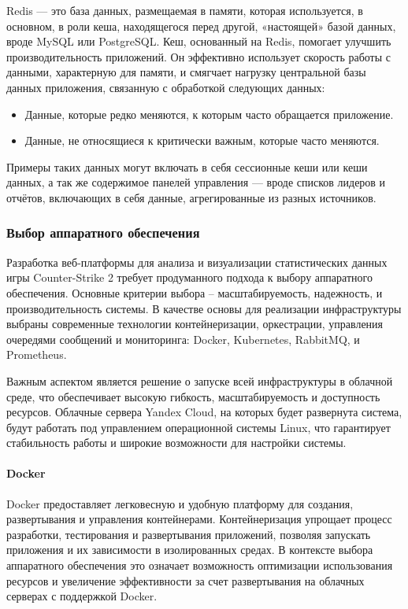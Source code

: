 Redis — это база данных, размещаемая в памяти, которая используется, в основном, в роли кеша, находящегося перед другой, «настоящей» базой данных, вроде MySQL или PostgreSQL. Кеш, основанный на Redis, помогает улучшить производительность приложений. Он эффективно использует скорость работы с данными, характерную для памяти, и смягчает нагрузку центральной базы данных приложения, связанную с обработкой следующих данных:
\begin{itemize}
	\item Данные, которые редко меняются, к которым часто обращается приложение.
	\item Данные, не относящиеся к критически важным, которые часто меняются.
\end{itemize}

Примеры таких данных могут включать в себя сессионные кеши или кеши данных, а так же содержимое панелей управления — вроде списков лидеров и отчётов, включающих в себя данные, агрегированные из разных источников.

\subsubsection{Выбор аппаратного обеспечения}

Разработка веб-платформы для анализа и визуализации статистических данных игры Counter-Strike 2 требует продуманного подхода к выбору аппаратного обеспечения. Основные критерии выбора – масштабируемость, надежность, и производительность системы. В качестве основы для реализации инфраструктуры выбраны современные технологии контейнеризации, оркестрации, управления очередями сообщений и мониторинга: Docker, Kubernetes, RabbitMQ, и Prometheus.

Важным аспектом является решение о запуске всей инфраструктуры в облачной среде, что обеспечивает высокую гибкость, масштабируемость и доступность ресурсов. Облачные сервера Yandex Cloud, на которых будет развернута система, будут работать под управлением операционной системы Linux, что гарантирует стабильность работы и широкие возможности для настройки системы.

\paragraph{Docker}

Docker предоставляет легковесную и удобную платформу для создания, развертывания и управления контейнерами. Контейнеризация упрощает процесс разработки, тестирования и развертывания приложений, позволяя запускать приложения и их зависимости в изолированных средах. В контексте выбора аппаратного обеспечения это означает возможность оптимизации использования ресурсов и увеличение эффективности за счет развертывания на облачных серверах с поддержкой Docker.

